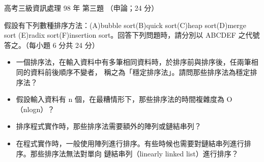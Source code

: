 \begin{pastexam}[label={px:gk3-098-ds-03}]{高考三級資訊處理 98 年 第三題}
（申論；24 分）

假設有下列數種排序方法：(A)bubble sort\quad (B)quick sort\quad (C)heap sort\quad (D)merge sort\quad
(E)radix sort\quad (F)insertion sort。回答下列問題時，請分別以 ABCDEF 之代號答之。（每小題 6 分共 24 分）
\begin{itemize}[leftmargin=2.2em]
\item[㈠] 一個排序法，在輸入資料中有多筆相同資料時，於排序前與排序後，任兩筆相同的資料前後順序不變者，
稱之為「穩定排序法」。請問那些排序法為穩定排序法？
\item[㈡] 假設輸入資料有 n 個，在最糟情形下，那些排序法的時間複雜度為 O（nlogn）？
\item[㈢] 排序程式實作時，那些排序法需要額外的陣列或鏈結串列？
\item[㈣] 在程式實作時，一般使用陣列進行排序。有些時候也需要對鏈結串列進行排序。那些排序法無法對單向
鏈結串列（linearly linked list）進行排序？
\end{itemize}
\end{pastexam}

